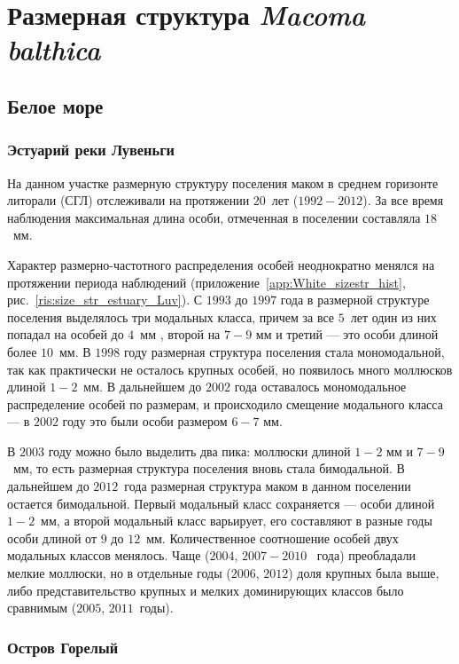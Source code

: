 	\section{Размерная структура {\it Macoma balthica}}

		\subsection{Белое море}

	\subsubsection{Эстуарий реки Лувеньги}
На данном участке размерную структуру поселения маком в среднем горизонте литорали (СГЛ) отслеживали на протяжении $20$~лет ($1992 - 2012$).
За все время наблюдения максимальная длина особи, отмеченная в поселении составляла $18$~мм.

Характер размерно-частотного распределения особей неоднократно менялся на протяжении периода наблюдений (приложение~\ref{app:White_sizestr_hist}, рис.~\ref{ris:size_str_estuary_Luv}).
С $1993$ до $1997$ года в размерной структуре поселения выделялось три модальных класса, причем за все $5$~лет один из них попадал на особей до $4$~мм , второй на $7 - 9$ мм и третий --- это особи длиной более $10$~мм. 
В $1998$ году размерная структура поселения стала мономодальной, так как практически не осталось крупных особей, но
появилось много моллюсков длиной $1-2$~мм. 
В дальнейшем до $2002$ года оставалось мономодальное распределение особей по размерам, и происходило смещение модального класса --- в $2002$ году это были особи размером $6-7$ мм. 

В $2003$ году можно было выделить два пика: моллюски длиной $1-2$ мм и $7-9$~мм, то есть размерная структура поселения вновь стала бимодальной. 
В дальнейшем до $2012$~года размерная структура маком в данном поселении остается бимодальной. 
Первый модальный класс сохраняется --- особи длиной $1-2$~мм, а второй модальный класс варьирует, его составляют в разные годы особи длиной от $9$ до $12$~мм.
Количественное соотношение особей двух модальных классов менялось. Чаще ($2004$, $2007 - 2010$~ года) преобладали мелкие моллюски, но в отдельные годы ($2006$, $2012$) доля крупных была выше, либо представительство крупных и мелких доминирующих классов было сравнимым ($2005$, $2011$~годы).



			\subsubsection{Остров Горелый}

